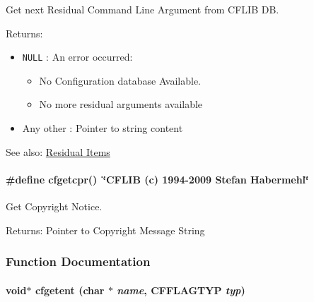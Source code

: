 Get next Residual Command Line Argument from CFLIB DB. 

\begin{Desc}
\item[Returns:]\begin{itemize}
\item {\tt NULL} : An error occurred:\begin{itemize}
\item No Configuration database Available. \item No more residual arguments available\end{itemize}
\end{itemize}
\begin{itemize}
\item Any other : Pointer to string content\end{itemize}
\end{Desc}
\begin{Desc}
\item[See also:]\hyperlink{config_levels_residuals}{Residual Items} \end{Desc}
\hypertarget{group__retrieval_g9999522b2acf8760f420d2567e7f7c50}{
\paragraph[{cfgetcpr}]{\setlength{\rightskip}{0pt plus 5cm}\#define cfgetcpr()~\char`\"{}CFLIB (c) 1994-2009 Stefan Habermehl\char`\"{}}\hfill}
\label{group__retrieval_g9999522b2acf8760f420d2567e7f7c50}


Get Copyright Notice. 

\begin{Desc}
\item[Returns:]Pointer to Copyright Message String \end{Desc}


\subsubsection{Function Documentation}
\hypertarget{group__retrieval_g872f83b13a8f722176f5e299f2a42e0f}{
\paragraph[{cfgetent}]{\setlength{\rightskip}{0pt plus 5cm}void$\ast$ cfgetent (char $\ast$ {\em name}, \/  {\bf CFFLAGTYP} {\em typ})}\hfill}
\label{group__retrieval_g872f83b13a8f722176f5e299f2a42e0f}


